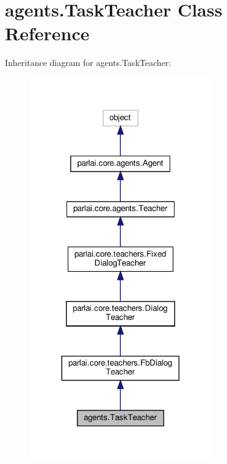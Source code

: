 \hypertarget{classagents_1_1TaskTeacher}{}\section{agents.\+Task\+Teacher Class Reference}
\label{classagents_1_1TaskTeacher}


Inheritance diagram for agents.\+Task\+Teacher\+:
\nopagebreak
\begin{figure}[H]
\begin{center}
\leavevmode
\includegraphics[width=224pt]{classagents_1_1TaskTeacher__inherit__graph}
\end{center}
\end{figure}


